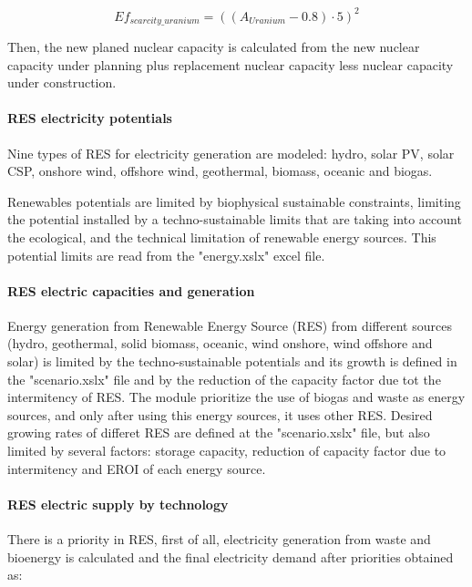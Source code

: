 \begin{equation}
Ef_{scarcity\_uranium}=  ((A_{Uranium}-0.8) \cdot 5)^2
\label{eq:effects-uranium-scarcity}
\end{equation}

Then, the new planed nuclear capacity is calculated from the new nuclear capacity under planning plus replacement nuclear capacity less nuclear capacity under construction.


\paragraph{RES electricity potentials}

Nine types of RES for electricity generation are modeled: hydro, solar PV, solar CSP, onshore wind, offshore wind, geothermal, biomass, oceanic and biogas.

Renewables potentials are limited by biophysical sustainable constraints, limiting the potential installed by a techno-sustainable limits that are taking into account the ecological, and the technical limitation of renewable energy sources. This potential limits are read from the "energy.xslx" excel file.

\paragraph{RES electric capacities and generation}

Energy generation from Renewable Energy Source (RES) from different sources (hydro, geothermal, solid biomass, oceanic, wind onshore, wind offshore and solar) is limited by the techno-sustainable potentials and its growth is defined in the "scenario.xslx" file and by the reduction of the capacity factor due tot the intermitency of RES. The module prioritize the use of biogas and waste as energy sources, and only after using this energy sources, it uses other RES. Desired growing rates of differet RES are defined at the "scenario.xslx" file, but also limited by several factors: storage capacity, reduction of capacity factor due to intermitency and EROI of each energy source.

\paragraph{RES electric supply by technology}

There is a priority in RES, first of all, electricity generation from waste and bioenergy is calculated and the final electricity demand after priorities obtained as:

